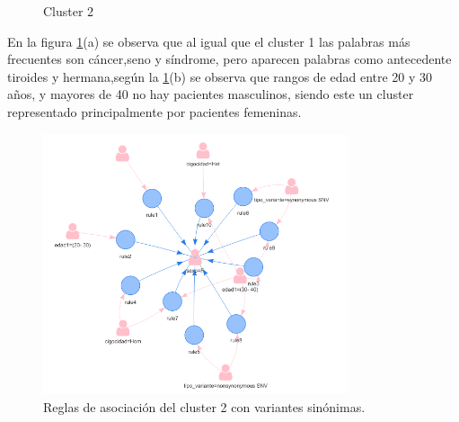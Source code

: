 \begin{figure}[H]
	\centering
	\caption{Cluster 2} \label{fig:c2}
\end{figure}

En la figura \ref{fig:c2}(a) se observa que al igual que el cluster 1 las palabras más frecuentes son cáncer,seno y síndrome, pero aparecen palabras como antecedente tiroides y hermana,según la \ref{fig:c2}(b) se observa que rangos de edad entre 20 y 30 años, y mayores de 40 no hay pacientes masculinos, siendo este un cluster representado principalmente por pacientes femeninas.  

\begin{figure}[H]
	\centering
	\includegraphics[width=0.8\textwidth]{Kap4/reglas2_1}
	\caption{Reglas de asociación del cluster 2 con variantes sinónimas.} \label{fig:reglas2_1}
\end{figure}


